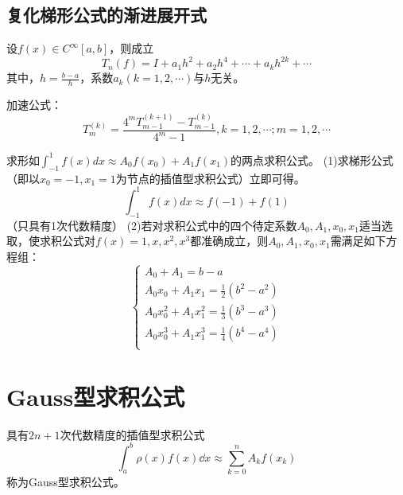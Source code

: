 \subsection{复化梯形公式的渐进展开式}
\begin{theorem}
    设$f(x)\in C^{\infty}[a,b]$，则成立
    \begin{equation*}
        T_n(f) = I+a_1h^2+a_2h^4+\cdots +a_kh^{2k}+\cdots 
    \end{equation*}
    其中，$h=\frac{b-a}{h}$，系数$a_k(k=1,2,\cdots)$与$h$无关。
\end{theorem}


加速公式：
\begin{equation*}
    T_m^{(k)} = \frac{4^mT_{m-1}^{(k+1)}-T_{m-1}^{(k)}}{4^m-1},k = 1,2,\cdots; m = 1,2,\cdots
\end{equation*}

\begin{example}
    求形如$\int_{-1}^{1}f(x)dx \approx A_0f(x_0)+A_1f(x_1)$的两点求积公式。
    (1)求梯形公式（即以$x_0 = -1,x_1 = 1$为节点的插值型求积公式）立即可得。
    \begin{equation*}
        \int_{-1}^{1}f(x)dx \approx f(-1)+f(1)
    \end{equation*}
    （只具有1次代数精度）
    (2)若对求积公式中的四个待定系数$A_0,A_1,x_0,x_1$适当选取，使求积公式对$f(x) = 1,x,x^2,x^3$都准确成立，则$A_0,A_1,x_0,x_1$需满足如下方程组：
    \begin{equation*}
        \begin{cases}
            A_0 + A_1 = b-a\\
            A_0x_0 + A_1x_1 = \frac{1}{2}(b^2-a^2)\\
            A_0x_0^2 + A_1x_1^2 = \frac{1}{3}(b^3-a^3)\\
            A_0x_0^3 + A_1x_1^3 = \frac{1}{4}(b^4-a^4)\\
        \end{cases}
    \end{equation*}
\end{example}


\section{Gauss型求积公式}

\begin{definition}[Gauss型求积公式]
    具有$2n+1$次代数精度的插值型求积公式
    \begin{equation*}
        \int_{a}^{b}\rho(x)f(x)\dd{x}\approx \sum_{k=0}^{n}A_kf(x_k)
    \end{equation*}
    称为Gauss型求积公式。
\end{definition}

